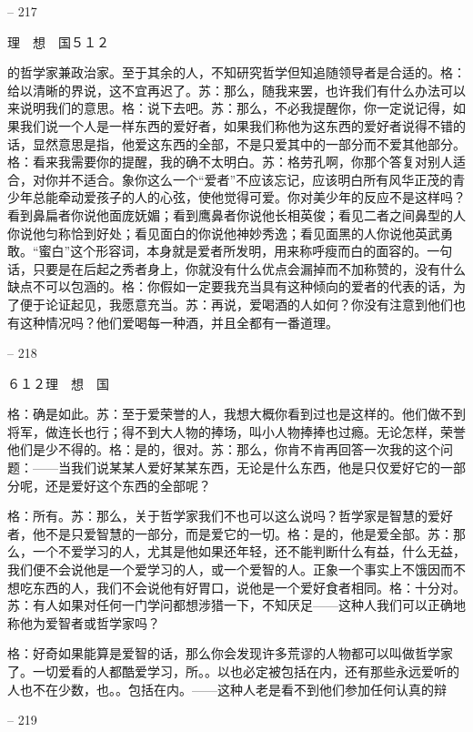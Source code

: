 \documentclass[11pt,oneside]{book}
\begin{document}
\begin{common-format}
    

-- 217

    理　想　国５１２

    的哲学家兼政治家。至于其余的人，不知研究哲学但知追随领导者是合适的。格：给以清晰的界说，这不宜再迟了。苏：那么，随我来罢，也许我们有什么办法可以来说明我们的意思。格：说下去吧。苏：那么，不必我提醒你，你一定说记得，如果我们说一个人是一样东西的爱好者，如果我们称他为这东西的爱好者说得不错的话，显然意思是指，他爱这东西的全部，不是只爱其中的一部分而不爱其他部分。格：看来我需要你的提醒，我的确不太明白。苏：格劳孔啊，你那个答复对别人适合，对你并不适合。象你这么一个“爱者”不应该忘记，应该明白所有风华正茂的青少年总能牵动爱孩子的人的心弦，使他觉得可爱。你对美少年的反应不是这样吗？看到鼻扁者你说他面庞妩媚；看到鹰鼻者你说他长相英俊；看见二者之间鼻型的人你说他匀称恰到好处；看见面白的你说他神妙秀逸；看见面黑的人你说他英武勇敢。“蜜白”这个形容词，本身就是爱者所发明，用来称呼瘦而白的面容的。一句话，只要是在后起之秀者身上，你就没有什么优点会漏掉而不加称赞的，没有什么缺点不可以包涵的。格：你假如一定要我充当具有这种倾向的爱者的代表的话，为了便于论证起见，我愿意充当。苏：再说，爱喝酒的人如何？你没有注意到他们也有这种情况吗？他们爱喝每一种酒，并且全都有一番道理。

    

-- 218

    ６１２理　想　国

    格：确是如此。苏：至于爱荣誉的人，我想大概你看到过也是这样的。他们做不到将军，做连长也行；得不到大人物的捧场，叫小人物捧捧也过瘾。无论怎样，荣誉他们是少不得的。格：是的，很对。苏：那么，你肯不肯再回答一次我的这个问题：——当我们说某某人爱好某某东西，无论是什么东西，他是只仅爱好它的一部分呢，还是爱好这个东西的全部呢？

    格：所有。苏：那么，关于哲学家我们不也可以这么说吗？哲学家是智慧的爱好者，他不是只爱智慧的一部分，而是爱它的一切。格：是的，他是爱全部。苏：那么，一个不爱学习的人，尤其是他如果还年轻，还不能判断什么有益，什么无益，我们便不会说他是一个爱学习的人，或一个爱智的人。正象一个事实上不饿因而不想吃东西的人，我们不会说他有好胃口，说他是一个爱好食者相同。格：十分对。苏：有人如果对任何一门学问都想涉猎一下，不知厌足——这种人我们可以正确地称他为爱智者或哲学家吗？

    格：好奇如果能算是爱智的话，那么你会发现许多荒谬的人物都可以叫做哲学家了。一切爱看的人都酷爱学习，所。。以也必定被包括在内，还有那些永远爱听的人也不在少数，也。。包括在内。——这种人老是看不到他们参加任何认真的辩

    

-- 219


\end{common-format}
\end{document}
